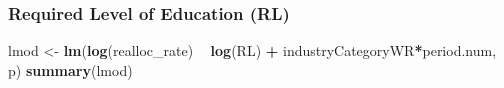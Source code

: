 \documentclass[
]{article}
\newenvironment{Shaded}{\begin{snugshade}}{\end{snugshade}}
\newcommand{\KeywordTok}[1]{\textcolor[rgb]{0.13,0.29,0.53}{\textbf{#1}}}
\newcommand{\NormalTok}[1]{#1}
\newcommand{\OperatorTok}[1]{\textcolor[rgb]{0.81,0.36,0.00}{\textbf{#1}}}
\newcommand{\StringTok}[1]{\textcolor[rgb]{0.31,0.60,0.02}{#1}}
\begin{document}
\hypertarget{required-level-of-education-rl-1}{%
\subsubsection{Required Level of Education
(RL)}\label{required-level-of-education-rl-1}}

\begin{Shaded}
\begin{Highlighting}[]
\NormalTok{lmod <-}\StringTok{ }\KeywordTok{lm}\NormalTok{(}\KeywordTok{log}\NormalTok{(realloc_rate) }\OperatorTok{~}\StringTok{ }\KeywordTok{log}\NormalTok{(RL) }\OperatorTok{+}\StringTok{ }\NormalTok{industryCategoryWR}\OperatorTok{*}\NormalTok{period.num, p)}
\KeywordTok{summary}\NormalTok{(lmod)}
\end{Highlighting}
\end{Shaded}
\end{document}
